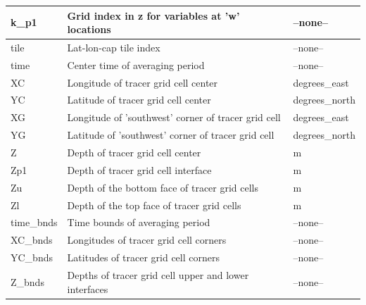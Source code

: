 \begin{longtable}{|m{}|m{}|m{}|}
k\_p1 &Grid index in z for variables at 'w' locations &--none--  \\ \hline
tile &Lat-lon-cap tile index &--none--  \\ \hline
time &Center time of averaging period &--none--  \\ \hline
XC &Longitude of tracer grid cell center &degrees\_east  \\ \hline
YC &Latitude of tracer grid cell center &degrees\_north  \\ \hline
XG &Longitude of 'southwest' corner of tracer grid cell &degrees\_east  \\ \hline
YG &Latitude of 'southwest' corner of tracer grid cell &degrees\_north  \\ \hline
Z &Depth of tracer grid cell center &m  \\ \hline
Zp1 &Depth of tracer grid cell interface &m  \\ \hline
Zu &Depth of the bottom face of tracer grid cells &m  \\ \hline
Zl &Depth of the top face of tracer grid cells &m  \\ \hline
time\_bnds &Time bounds of averaging period &--none--  \\ \hline
XC\_bnds &Longitudes of tracer grid cell corners &--none--  \\ \hline
YC\_bnds &Latitudes of tracer grid cell corners &--none--  \\ \hline
Z\_bnds &Depths of tracer grid cell upper and lower interfaces &--none--  \\ \hline
\end{longtable}

\newp
\pagebreak
